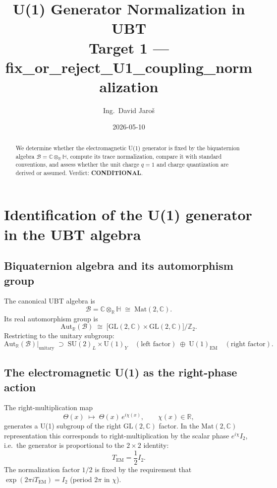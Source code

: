 \documentclass[11pt,a4paper]{article}
\title{U(1) Generator Normalization in UBT\\
\large Target 1 — fix\_or\_reject\_U1\_coupling\_normalization}
\author{Ing.\ David Jaroš}
\date{2026-05-10}
\begin{document}
\maketitle

\begin{abstract}
We determine whether the electromagnetic U(1) generator is fixed by the
biquaternion algebra $\mathcal{B}=\mathbb{C}\otimes_{\mathbb{R}}\mathbb{H}$,
compute its trace normalization, compare it with standard conventions, and
assess whether the unit charge $q=1$ and charge quantization are derived or
assumed.  Verdict: \textbf{CONDITIONAL}.
\end{abstract}

\section{Identification of the U(1) generator in the UBT algebra}

\subsection{Biquaternion algebra and its automorphism group}

The canonical UBT algebra is
\begin{equation}
  \mathcal{B}=\mathbb{C}\otimes_{\mathbb{R}}\mathbb{H}
  \;\cong\;\mathrm{Mat}(2,\mathbb{C}).
\end{equation}
Its real automorphism group is
\begin{equation}
  \mathrm{Aut}_{\mathbb{R}}(\mathcal{B})
  \;\cong\;\bigl[\mathrm{GL}(2,\mathbb{C})\times\mathrm{GL}(2,\mathbb{C})\bigr]/\mathbb{Z}_2.
\end{equation}
Restricting to the unitary subgroup:
\begin{equation}
  \mathrm{Aut}_{\mathbb{R}}(\mathcal{B})\big|_{\mathrm{unitary}}
  \;\supset\;\mathrm{SU}(2)_L\times\mathrm{U}(1)_Y
  \quad(\text{left factor})
  \;\oplus\;\mathrm{U}(1)_{\mathrm{EM}}\quad(\text{right factor}).
\end{equation}

\subsection{The electromagnetic U(1) as the right-phase action}

The right-multiplication map
\begin{equation}
  \Theta(x)\;\longmapsto\;\Theta(x)\,e^{i\chi(x)},
  \qquad \chi(x)\in\mathbb{R},
\end{equation}
generates a U(1) subgroup of the right $\mathrm{GL}(2,\mathbb{C})$ factor.
In the $\mathrm{Mat}(2,\mathbb{C})$ representation this corresponds to
right-multiplication by the scalar phase $e^{i\chi}I_2$, i.e.\ the generator
is proportional to the $2\times 2$ identity:
\begin{equation}
  T_{\mathrm{EM}} = \frac{1}{2}I_2.
\end{equation}
The normalization factor $1/2$ is fixed by the requirement that
$\exp(2\pi i T_{\mathrm{EM}})=I_2$ (period $2\pi$ in $\chi$).
\end{document}
